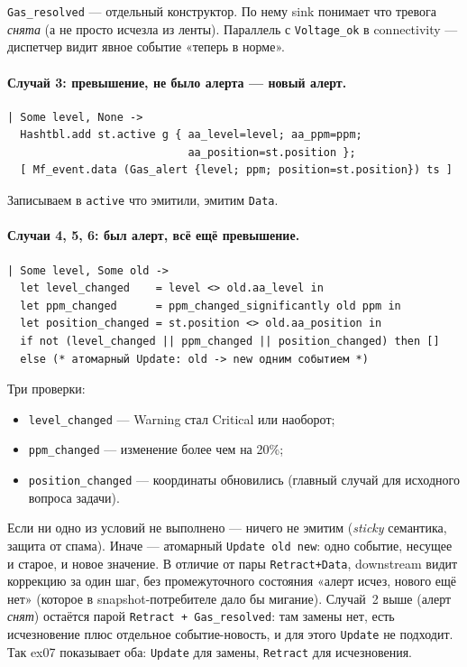\texttt{Gas\_resolved} --- отдельный конструктор. По нему sink
понимает что тревога \emph{снята} (а не просто исчезла из ленты).
Параллель с \texttt{Voltage\_ok} в connectivity --- диспетчер видит
явное событие «теперь в норме».

\paragraph{Случай 3: превышение, не было алерта --- новый алерт.}
\begin{lstlisting}
| Some level, None ->
  Hashtbl.add st.active g { aa_level=level; aa_ppm=ppm;
                            aa_position=st.position };
  [ Mf_event.data (Gas_alert {level; ppm; position=st.position}) ts ]
\end{lstlisting}

Записываем в \texttt{active} что эмитили, эмитим \texttt{Data}.

\paragraph{Случаи 4, 5, 6: был алерт, всё ещё превышение.}

\begin{lstlisting}
| Some level, Some old ->
  let level_changed    = level <> old.aa_level in
  let ppm_changed      = ppm_changed_significantly old ppm in
  let position_changed = st.position <> old.aa_position in
  if not (level_changed || ppm_changed || position_changed) then []
  else (* атомарный Update: old -> new одним событием *)
\end{lstlisting}

Три проверки:

\begin{itemize}
\item \texttt{level\_changed} --- Warning стал Critical или наоборот;
\item \texttt{ppm\_changed} --- изменение более чем на 20\%;
\item \texttt{position\_changed} --- координаты обновились (главный
случай для исходного вопроса задачи).
\end{itemize}

Если ни одно из условий не выполнено --- ничего не эмитим
(\emph{sticky} семантика, защита от спама). Иначе --- атомарный
\texttt{Update old new}: одно событие, несущее и старое, и новое
значение. В отличие от пары \texttt{Retract+Data}, downstream видит
коррекцию за один шаг, без промежуточного состояния «алерт исчез, нового
ещё нет» (которое в snapshot-потребителе дало бы мигание). Случай~2 выше
(алерт \emph{снят}) остаётся парой \texttt{Retract + Gas\_resolved}: там
замены нет, есть исчезновение плюс отдельное событие-новость, и для этого
\texttt{Update} не подходит. Так ex07 показывает оба: \texttt{Update} для
замены, \texttt{Retract} для исчезновения.

